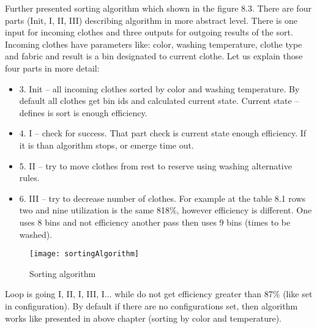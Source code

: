 Further presented sorting algorithm which shown in the figure 8.3. There are four parts (Init, I, II, III) describing algorithm in more abstract level. There is one input for incoming clothes and three outputs for outgoing results of the sort. Incoming clothes have parameters like: color, washing temperature, clothe type and fabric and result is a bin designated to current clothe.  Let us explain those four parts in more detail:

\begin{itemize}
	\item 3. Init – all incoming clothes sorted by color and washing temperature. By default all clothes get bin ids and calculated current state. Current state – defines is sort is enough efficiency.
	\item 4. I – check for success. That part check is current state enough efficiency. If it is than algorithm stops, or emerge time out.
	\item 5. II – try to move clothes from rest to reserve using washing alternative rules. 
	\item 6. III – try to decrease number of clothes. For example at the table 8.1 rows two and nine utilization is the same 818\%, however efficiency is different. One uses 8 bins and not efficiency another pass then uses 9 bins (times to be washed).
\end{itemize}

\begin{figure}[h]
	\centering
		\texttt{[image: sortingAlgorithm]}
	\caption{Sorting algorithm}
	\label{fig:planning}
\end{figure}

Loop is going I, II, I, III, I... while do not get efficiency greater than 87\% (like set in configuration). By default if there are no configurations set, then algorithm works like presented in above chapter (sorting by color and temperature).

